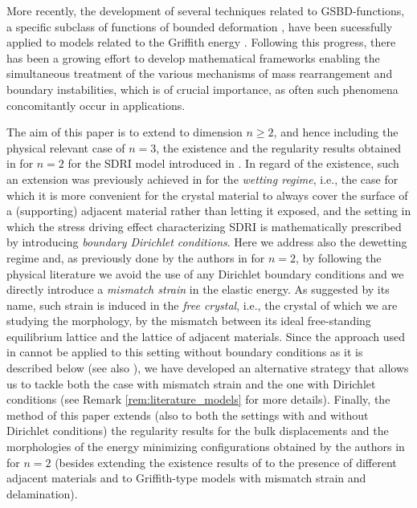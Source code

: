 \documentclass[reqno]{amsart}
\numberwithin{equation}{section}
\theoremstyle{plain}
\theoremstyle{definition}
\begin{document}
More recently, the development of several techniques  related to GSBD-functions, a specific subclass of functions of bounded deformation \cite{D:2013_jems}, have been sucessfully applied to models related to the  Griffith energy \cite{CCF:2016,CCI:2017,ChC:2019_arxiv,ChC:2020_jems,D:2013_jems,FGL:2019}. Following this progress, there has been a growing effort \cite{ChC:2020_arxiv,CF:2020_arma,HP:2020_arma,HP:2021_arxiv} to develop  mathematical frameworks enabling the simultaneous treatment of the various mechanisms of mass rearrangement and boundary instabilities, which is of crucial importance, as often such phenomena concomitantly occur in applications.

The aim of  this paper is to extend to dimension  $n\ge2$, and hence including the physical relevant case of $n=3$, the existence and the regularity results  obtained in \cite{HP:2021_arxiv} for $n=2$ for the SDRI model introduced in  \cite{HP:2020_arma}.  In regard of the existence, such an extension was previously achieved in \cite{CF:2020_arma}  for the  \emph{wetting regime}, i.e., the case  for which it is more convenient for the crystal material to always cover the surface of a (supporting) adjacent material rather than letting it exposed,  and the setting in which the stress driving effect characterizing SDRI is mathematically prescribed by introducing  \emph{boundary Dirichlet conditions}. Here we address also the dewetting regime and,  as previously done by the authors in \cite{HP:2020_arma,HP:2021_arxiv} for $n=2$, by following  the physical literature \cite{AT:1972,D:2001,FG:2004,Gr:1993,Spencer:1999,Srolovitz:1989,Xia:2000} we avoid the use of any Dirichlet boundary conditions and we directly introduce a \emph{mismatch strain}  in the elastic energy. As suggested by its name, such strain is induced in the \emph{free crystal}, i.e., the crystal of which we are studying the morphology,  by the mismatch between its ideal free-standing equilibrium lattice and the lattice of adjacent materials. Since the approach used in \cite{CF:2020_arma} cannot be applied to this setting without boundary conditions as it is described below (see also \cite{HP:2021_arxiv}), we have developed an alternative strategy that allows us to tackle both the case with mismatch strain and the one with Dirichlet conditions (see Remark \ref{rem:literature_models} for more details).   Finally, the method of this paper extends (also to both the settings with and without Dirichlet conditions) the regularity results for the bulk displacements and the morphologies of the energy minimizing configurations obtained by the authors in \cite{HP:2021_arxiv} for $n=2$  (besides extending the existence results of \cite{HP:2021_arxiv} to the presence of different adjacent materials and to Griffith-type models with mismatch strain and delamination). 
 
\end{document}
